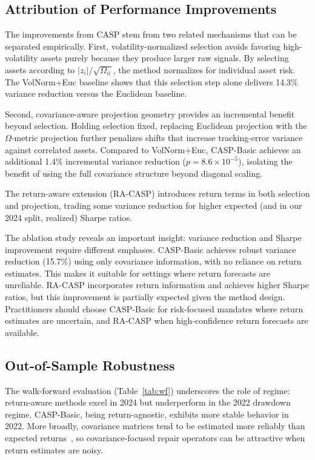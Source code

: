 \documentclass[10pt,twocolumn,a4paper]{article}
\begin{document}
\subsection{Attribution of Performance Improvements}

The improvements from CASP stem from two related mechanisms that can be separated empirically. First, volatility-normalized selection avoids favoring high-volatility assets purely because they produce larger raw signals. By selecting assets according to $|z_i|/\sqrt{\Omega_{ii}}$, the method normalizes for individual asset risk. The VolNorm+Euc baseline shows that this selection step alone delivers 14.3\% variance reduction versus the Euclidean baseline.

Second, covariance-aware projection geometry provides an incremental benefit beyond selection. Holding selection fixed, replacing Euclidean projection with the $\Omega$-metric projection further penalizes shifts that increase tracking-error variance against correlated assets. Compared to VolNorm+Euc, CASP-Basic achieves an additional 1.4\% incremental variance reduction ($p=8.6\times 10^{-5}$), isolating the benefit of using the full covariance structure beyond diagonal scaling.

The return-aware extension (RA-CASP) introduces return terms in both selection and projection, trading some variance reduction for higher expected (and in our 2024 split, realized) Sharpe ratios.

The ablation study reveals an important insight: variance reduction and Sharpe improvement require different emphases. CASP-Basic achieves robust variance reduction (15.7\%) using only covariance information, with no reliance on return estimates. This makes it suitable for settings where return forecasts are unreliable. RA-CASP incorporates return information and achieves higher Sharpe ratios, but this improvement is partially expected given the method design. Practitioners should choose CASP-Basic for risk-focused mandates where return estimates are uncertain, and RA-CASP when high-confidence return forecasts are available.

\subsection{Out-of-Sample Robustness}

The walk-forward evaluation (Table~\ref{tab:wf}) underscores the role of regime: return-aware methods excel in 2024 but underperform in the 2022 drawdown regime. CASP-Basic, being return-agnostic, exhibits more stable behavior in 2022. More broadly, covariance matrices tend to be estimated more reliably than expected returns~\cite{taljaard2021portfolio, ledoit2004honey}, so covariance-focused repair operators can be attractive when return estimates are noisy.
\end{document}
